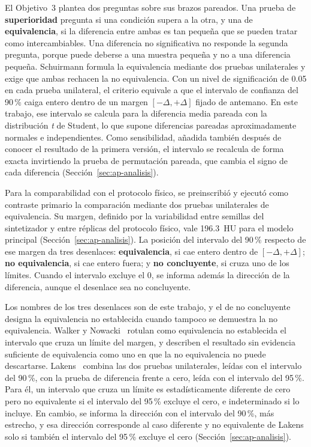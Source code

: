 El Objetivo~3 plantea dos preguntas sobre sus brazos pareados. Una prueba de \textbf{superioridad} pregunta si una condición supera a la otra, y una de \textbf{equivalencia}, si la diferencia entre ambas es tan pequeña que se pueden tratar como intercambiables. Una diferencia no significativa no responde la segunda pregunta, porque puede deberse a una muestra pequeña y no a una diferencia pequeña. Schuirmann \cite{schuirmann1987comparison} formula la equivalencia mediante dos pruebas unilaterales y exige que ambas rechacen la no equivalencia. Con un nivel de significación de 0.05 en cada prueba unilateral, el criterio equivale a que el intervalo de confianza del 90\,\% caiga entero dentro de un margen $[-\Delta, +\Delta]$ fijado de antemano. En este trabajo, ese intervalo se calcula para la diferencia media pareada con la distribución \emph{t} de Student, lo que supone diferencias pareadas aproximadamente normales e independientes. Como sensibilidad, añadida también después de conocer el resultado de la primera versión, el intervalo se recalcula de forma exacta invirtiendo la prueba de permutación pareada, que cambia el signo de cada diferencia (Sección~\ref{sec:ap-analisis}).

Para la comparabilidad con el protocolo físico, se preinscribió y ejecutó como contraste primario la comparación mediante dos pruebas unilaterales de equivalencia. Su margen, definido por la variabilidad entre semillas del sintetizador y entre réplicas del protocolo físico, vale 196.3~HU para el modelo principal (Sección~\ref{sec:ap-analisis}). La posición del intervalo del 90\,\% respecto de ese margen da tres desenlaces: \textbf{equivalencia}, si cae entero dentro de $[-\Delta, +\Delta]$; \textbf{no equivalencia}, si cae entero fuera; y \textbf{no concluyente}, si cruza uno de los límites. Cuando el intervalo excluye el 0, se informa además la dirección de la diferencia, aunque el desenlace sea no concluyente.

Los nombres de los tres desenlaces son de este trabajo, y el de no concluyente designa la equivalencia no establecida cuando tampoco se demuestra la no equivalencia. Walker y Nowacki~\cite{walker2011understanding} rotulan como equivalencia no establecida el intervalo que cruza un límite del margen, y describen el resultado sin evidencia suficiente de equivalencia como uno en que la no equivalencia no puede descartarse. Lakens~\cite{lakens2017equivalence} combina las dos pruebas unilaterales, leídas con el intervalo del 90\,\%, con la prueba de diferencia frente a cero, leída con el intervalo del 95\,\%. Para él, un intervalo que cruza un límite es estadísticamente diferente de cero pero no equivalente si el intervalo del 95\,\% excluye el cero, e indeterminado si lo incluye. En cambio, se informa la dirección con el intervalo del 90\,\%, más estrecho, y esa dirección corresponde al caso diferente y no equivalente de Lakens solo si también el intervalo del 95\,\% excluye el cero (Sección~\ref{sec:ap-analisis}).

